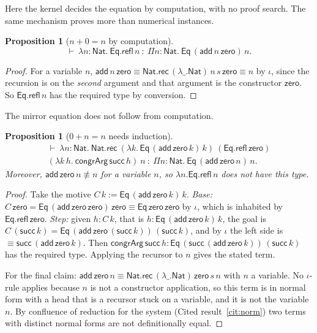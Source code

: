 \documentclass[11pt]{article}
\theoremstyle{definition}
\theoremstyle{plain}
\newtheorem{proposition}[definition]{Proposition}
\theoremstyle{remark}
\begin{document}
Here the kernel decides the equation by computation, with no proof search. The same mechanism proves more than numerical instances.

\begin{proposition}[$n+0=n$ by computation]\label{prop:nplus0}
\[\vdash\ \lambda n{:}\mathsf{Nat}.\ \mathsf{Eq.refl}\,n\ :\ \Pi n{:}\mathsf{Nat}.\ \mathsf{Eq}\,(\mathsf{add}\,n\,\mathsf{zero})\,n.\]
\end{proposition}
\begin{proof}
For a variable $n$, $\mathsf{add}\,n\,\mathsf{zero}\equiv\mathsf{Nat.rec}\,(\lambda\_.\mathsf{Nat})\,n\,s\,\mathsf{zero}\equiv n$ by $\iota$, since the recursion is on the \emph{second} argument and that argument is the constructor $\mathsf{zero}$. So $\mathsf{Eq.refl}\,n$ has the required type by conversion.
\end{proof}

The mirror equation does not follow from computation.

\begin{proposition}[$0+n=n$ needs induction]\label{prop:zeroplus}
\begin{multline*}
\vdash\ \lambda n{:}\mathsf{Nat}.\ \mathsf{Nat.rec}\ (\lambda k.\,\mathsf{Eq}\,(\mathsf{add}\,\mathsf{zero}\,k)\,k)\ (\mathsf{Eq.refl}\,\mathsf{zero})\\
(\lambda k\,h.\ \mathsf{congrArg}\,\mathsf{succ}\,h)\ n\ :\ \Pi n{:}\mathsf{Nat}.\ \mathsf{Eq}\,(\mathsf{add}\,\mathsf{zero}\,n)\,n.
\end{multline*}
Moreover, $\mathsf{add}\,\mathsf{zero}\,n\not\equiv n$ for a variable $n$, so $\lambda n.\mathsf{Eq.refl}\,n$ does \emph{not} have this type.
\end{proposition}
\begin{proof}
Take the motive $C\,k:=\mathsf{Eq}\,(\mathsf{add}\,\mathsf{zero}\,k)\,k$. \emph{Base:} $C\,\mathsf{zero}=\mathsf{Eq}\,(\mathsf{add}\,\mathsf{zero}\,\mathsf{zero})\,\mathsf{zero}\equiv\mathsf{Eq}\,\mathsf{zero}\,\mathsf{zero}$ by $\iota$, which is inhabited by $\mathsf{Eq.refl}\,\mathsf{zero}$. \emph{Step:} given $h:C\,k$, that is $h:\mathsf{Eq}\,(\mathsf{add}\,\mathsf{zero}\,k)\,k$, the goal is $C\,(\mathsf{succ}\,k)=\mathsf{Eq}\,(\mathsf{add}\,\mathsf{zero}\,(\mathsf{succ}\,k))\,(\mathsf{succ}\,k)$, and by $\iota$ the left side is $\equiv\mathsf{succ}\,(\mathsf{add}\,\mathsf{zero}\,k)$. Then $\mathsf{congrArg}\,\mathsf{succ}\,h:\mathsf{Eq}\,(\mathsf{succ}\,(\mathsf{add}\,\mathsf{zero}\,k))\,(\mathsf{succ}\,k)$ has the required type. Applying the recursor to $n$ gives the stated term.

For the final claim: $\mathsf{add}\,\mathsf{zero}\,n\equiv\mathsf{Nat.rec}\,(\lambda\_.\mathsf{Nat})\,\mathsf{zero}\,s\,n$ with $n$ a variable. No $\iota$-rule applies because $n$ is not a constructor application, so this term is in normal form with a head that is a recursor stuck on a variable, and it is not the variable $n$. By confluence of reduction for the system (Cited result~\ref{cit:norm}) two terms with distinct normal forms are not definitionally equal.
\end{proof}
\end{document}
